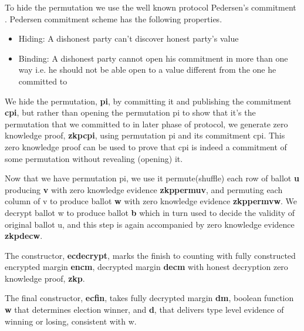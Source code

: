 \documentclass{llncs}
\begin{document}
To hide the permutation we use the well known protocol Pedersen's 
commitment \cite{Pederson}. Pedersen commitment scheme has 
the following properties. 
\begin{itemize}
\item Hiding: A dishonest party can't discover honest party's value 
\item Binding: A dishonest party cannot open his commitment in more  
	 	than one way i.e. he should not be able open to a value 
	 	different from the one he committed to 
\end{itemize}


We hide the permutation, \textbf{pi}, by committing it and publishing 
the commitment \textbf{cpi}, but rather than opening the permutation pi 
to show that it's the permutation that we committed to in later phase of 
protocol, we generate zero knowledge proof,
 \textbf{zkpcpi}, using permutation pi and its commitment cpi. This 
 zero knowledge proof can be  used to prove that cpi is indeed a commitment 
 of some permutation without revealing (opening) it. 
 
Now that we have permutation pi, we use it permute(shuffle) each row of 
ballot \textbf{u} producing \textbf{v} with zero knowledge evidence 
\textbf{zkppermuv}, and permuting each column 
of v to produce ballot \textbf{w} with zero knowledge evidence 
\textbf{zkppermvw}. We decrypt ballot w to produce ballot \textbf{b} 
which in turn used to decide the validity of original ballot u, and 
this step is again accompanied by zero knowledge evidence \textbf{zkpdecw}.


The constructor, \textbf{ecdecrypt}, marks the finish to counting with 
fully constructed encrypted margin \textbf{encm}, 
decrypted margin \textbf{decm} with honest decryption zero knowledge proof, 
\textbf{zkp}.

The final constructor, \textbf{ecfin}, takes fully decrypted margin 
\textbf{dm}, boolean function \textbf{w} that determines election winner, 
and \textbf{d}, that delivers type level evidence of winning or losing, 
consistent with w.
\end{document}
